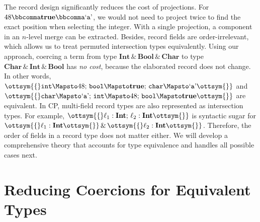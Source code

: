 The record design significantly reduces the cost of projections. For
$48  \bbcomma   \mathbf{true}   \bbcomma   \text{`\texttt{a}'} $, we would not need to project twice to find the exact position
when selecting the integer. With a single projection, a component in an $n$-level
merge can be extracted. Besides, record fields are order-irrelevant, which
allows us to treat permuted intersection types equivalently. Using our approach,
coercing a term from type $ \mathbf{Int}   \, {\&} \,   \mathbf{Bool}   \, {\&} \,   \mathbf{Char} $ to type $ \mathbf{Char}   \, {\&} \,   \mathbf{Int}   \, {\&} \,   \mathbf{Bool} $ has
\emph{no cost}, because the elaborated record does not change. In other words,
$\ottsym{\{}   \mathtt{int}   \Mapsto  48  ; \,   \mathtt{bool}   \Mapsto   \mathbf{true}   ; \,   \mathtt{char}   \Mapsto   \text{`\texttt{a}'}   \ottsym{\}}$ and $\ottsym{\{}   \mathtt{char}   \Mapsto   \text{`\texttt{a}'}   ; \,   \mathtt{int}   \Mapsto  48  ; \,   \mathtt{bool}   \Mapsto   \mathbf{true}   \ottsym{\}}$ are equivalent. In CP, multi-field record types are also
represented as intersection types. For example, $\ottsym{\{}  \ell_{{\mathrm{1}}}  :   \mathbf{Int}   ; \,  \ell_{{\mathrm{2}}}  :   \mathbf{Int}   \ottsym{\}}$ is
syntactic sugar for $\ottsym{\{}  \ell_{{\mathrm{1}}}  :   \mathbf{Int}   \ottsym{\}}  \, {\&} \,  \ottsym{\{}  \ell_{{\mathrm{2}}}  :   \mathbf{Int}   \ottsym{\}}$. Therefore, the order of fields in a
record type does not matter either. We will develop a comprehensive theory that
accounts for type equivalence and handles all possible cases next.

\section{Reducing Coercions for Equivalent Types} \label{sec:eqty}

